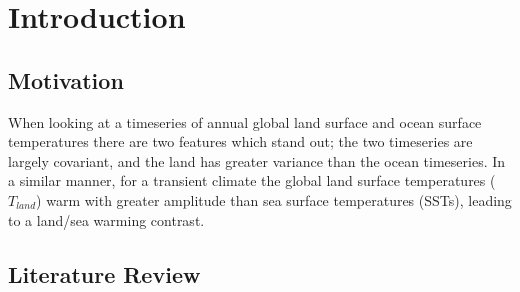 \chapter{Introduction} %

\label{introduction} %



\section{Motivation}

When looking at a timeseries of annual global land surface and ocean surface
temperatures there are two features which stand out; the two timeseries are 
largely covariant, and the land has greater variance than the ocean timeseries.  
In a similar manner, for a transient climate the global land surface 
temperatures ($T_{land}$) warm with greater amplitude than sea surface 
temperatures (SSTs), leading to a land/sea warming contrast.

\section{Literature Review}

